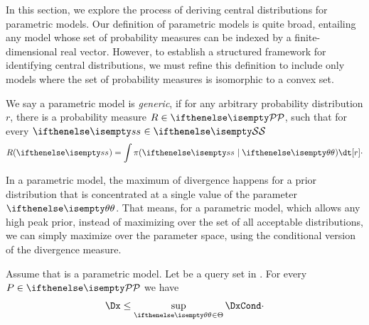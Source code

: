 In this section, we explore the process of deriving central distributions for parametric models.
Our definition of parametric models is quite broad, entailing any model whose set of probability measures can be
indexed by a finite-dimensional real vector.
However, to establish a structured framework for identifying central distributions, we must refine this definition
to include only models where the set of probability measures is isomorphic to a convex set.

\begin{definition}
    We say a parametric model \pmodel is \emph{generic}, if for any arbitrary probability distribution $r$,
    there is a probability measure $R \in \set{P}$, such that for every $\rval[]{s} \in \set{s}$
    \[
        \marginalEq[r]{\rval[]{s}}\cdot
    \]
\end{definition}

In a parametric model, the maximum of divergence happens for a prior distribution
that is concentrated at a single value of the parameter $\paramValue$.
That means, for a parametric model, which allows any high peak prior, instead of maximizing over the set of
all acceptable distributions, we can simply maximize over the parameter space, using the conditional version
of the divergence measure.

\begin{lemma}
    \label{lm:DxP_uppper_bound}
    Assume that \pmodel is a parametric model.
    Let \Xpairs be a query set in \Mt.
    For every $P \in \set{P}$ we have
    \begin{equation*}
        \Dx \leq \supParam \DxCond \cdot
    \end{equation*}
\end{lemma}

